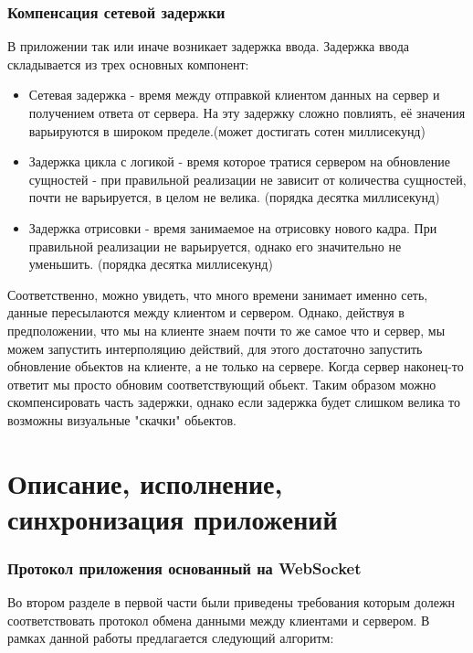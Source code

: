 \documentclass[a4paper,14pt, openany]{book}
\begin{document}
\subsection{Компенсация сетевой задержки}

В приложении так или иначе возникает задержка ввода. Задержка ввода складывается из трех основных компонент:

\begin{itemize}
   \item Сетевая задержка - время между отправкой клиентом данных на сервер и получением ответа от сервера. На эту задержку сложно повлиять, её значения варьируются в широком пределе.(может достигать сотен миллисекунд)
   \item Задержка цикла с логикой - время которое тратися сервером на обновление сущностей - при правильной реализации не зависит от количества сущностей, почти не варьируется, в целом не велика. (порядка десятка миллисекунд)
   \item Задержка отрисовки - время занимаемое на отрисовку нового кадра. При правильной реализации не варьируется, однако его значительно не уменьшить. (порядка десятка миллисекунд)
\end{itemize}

Соответственно, можно увидеть, что много времени занимает именно сеть, данные пересылаются между клиентом и сервером. Однако, действуя в предположении, что мы на клиенте знаем почти то же самое что и сервер, мы можем запустить интерполяцию действий, для этого достаточно запустить обновление обьектов на клиенте, а не только на сервере. Когда сервер наконец-то ответит мы просто обновим соответствующий обьект. Таким образом можно скомпенсировать часть задержки, однако если задержка будет слишком велика то возможны визуальные "скачки" обьектов. 

\chapter {Описание, исполнение, синхронизация приложений}



\subsection{Протокол приложения основанный на WebSocket}

Во втором разделе в первой части были приведены требования которым долежн соответствовать протокол обмена данными между клиентами и сервером. В рамках данной работы предлагается следующий алгоритм:
\end{document}
